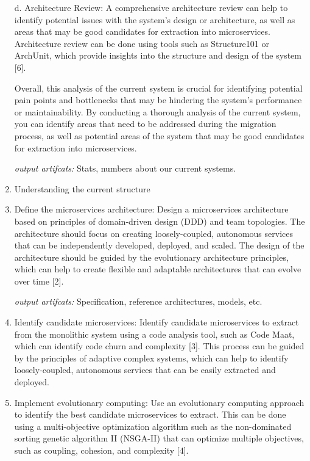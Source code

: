\begin{enumerate}
d. Architecture Review: A comprehensive architecture review can help to identify potential issues with the system's design or architecture, as well as areas that may be good candidates for extraction into microservices. Architecture review can be done using tools such as Structure101 or ArchUnit, which provide insights into the structure and design of the system [6].

Overall, this analysis of the current system is crucial for identifying potential pain points and bottlenecks that may be hindering the system's performance or maintainability. By conducting a thorough analysis of the current system, you can identify areas that need to be addressed during the migration process, as well as potential areas of the system that may be good candidates for extraction into microservices.

\emph{output artifcats:} Stats, numbers about our current systems. 

\item Understanding the current structure 

\item Define the microservices architecture: Design a microservices architecture based on principles of domain-driven design (DDD) and team topologies. The architecture should focus on creating loosely-coupled, autonomous services that can be independently developed, deployed, and scaled. The design of the architecture should be guided by the evolutionary architecture principles, which can help to create flexible and adaptable architectures that can evolve over time [2].

\emph{output artifcats:} Specification, reference architectures, models, etc. 

\item Identify candidate microservices: Identify candidate microservices to extract from the monolithic system using a code analysis tool, such as Code Maat, which can identify code churn and complexity [3]. This process can be guided by the principles of adaptive complex systems, which can help to identify loosely-coupled, autonomous services that can be easily extracted and deployed.


\item Implement evolutionary computing: Use an evolutionary computing approach to identify the best candidate microservices to extract. This can be done using a multi-objective optimization algorithm such as the non-dominated sorting genetic algorithm II (NSGA-II) that can optimize multiple objectives, such as coupling, cohesion, and complexity [4].


\end{enumerate}
